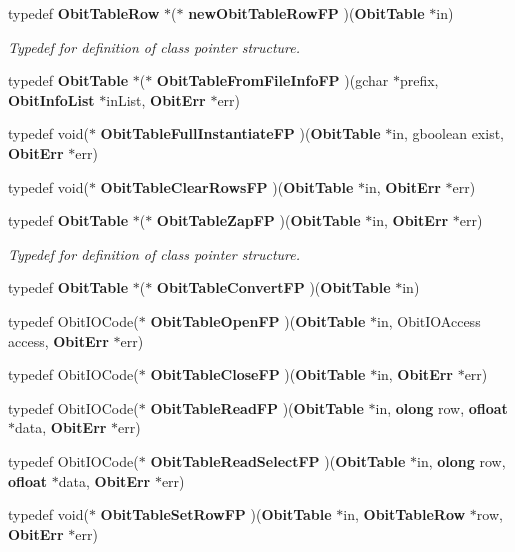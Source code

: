 \begin{CompactItemize}
\item 
typedef {\bf Obit\-Table\-Row} $\ast$($\ast$ {\bf new\-Obit\-Table\-Row\-FP} )({\bf Obit\-Table} $\ast$in)
\begin{CompactList}\small\item\em Typedef for definition of class pointer structure. \item\end{CompactList}\item 
typedef {\bf Obit\-Table} $\ast$($\ast$ {\bf Obit\-Table\-From\-File\-Info\-FP} )(gchar $\ast$prefix, {\bf Obit\-Info\-List} $\ast$in\-List, {\bf Obit\-Err} $\ast$err)
\item 
typedef void($\ast$ {\bf Obit\-Table\-Full\-Instantiate\-FP} )({\bf Obit\-Table} $\ast$in, gboolean exist, {\bf Obit\-Err} $\ast$err)
\item 
typedef void($\ast$ {\bf Obit\-Table\-Clear\-Rows\-FP} )({\bf Obit\-Table} $\ast$in, {\bf Obit\-Err} $\ast$err)
\item 
typedef {\bf Obit\-Table} $\ast$($\ast$ {\bf Obit\-Table\-Zap\-FP} )({\bf Obit\-Table} $\ast$in, {\bf Obit\-Err} $\ast$err)
\begin{CompactList}\small\item\em Typedef for definition of class pointer structure. \item\end{CompactList}\item 
typedef {\bf Obit\-Table} $\ast$($\ast$ {\bf Obit\-Table\-Convert\-FP} )({\bf Obit\-Table} $\ast$in)
\item 
typedef Obit\-IOCode($\ast$ {\bf Obit\-Table\-Open\-FP} )({\bf Obit\-Table} $\ast$in, Obit\-IOAccess access, {\bf Obit\-Err} $\ast$err)
\item 
typedef Obit\-IOCode($\ast$ {\bf Obit\-Table\-Close\-FP} )({\bf Obit\-Table} $\ast$in, {\bf Obit\-Err} $\ast$err)
\item 
typedef Obit\-IOCode($\ast$ {\bf Obit\-Table\-Read\-FP} )({\bf Obit\-Table} $\ast$in, {\bf olong} row, {\bf ofloat} $\ast$data, {\bf Obit\-Err} $\ast$err)
\item 
typedef Obit\-IOCode($\ast$ {\bf Obit\-Table\-Read\-Select\-FP} )({\bf Obit\-Table} $\ast$in, {\bf olong} row, {\bf ofloat} $\ast$data, {\bf Obit\-Err} $\ast$err)
\item 
typedef void($\ast$ {\bf Obit\-Table\-Set\-Row\-FP} )({\bf Obit\-Table} $\ast$in, {\bf Obit\-Table\-Row} $\ast$row, {\bf Obit\-Err} $\ast$err)
\item 

\end{CompactItemize}
